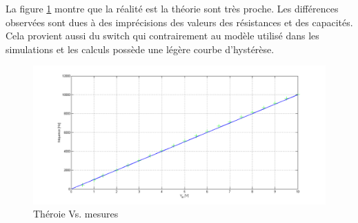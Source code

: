 La figure \ref{fig:theory_vs_mesure} montre que la réalité est la théorie sont très proche.
Les différences observées sont dues à des imprécisions des valeurs des résistances et des 
capacités. Cela provient aussi du switch qui contrairement au modèle utilisé dans les 
simulations et les calculs possède une légère courbe d'hystérèse.
\begin{figure}
	\centering
	\includegraphics[scale=0.45]{img-vco/vco_vs_reality.png}
	\caption{ Théroie Vs. mesures}
	\label{fig:theory_vs_mesure}
\end{figure}
